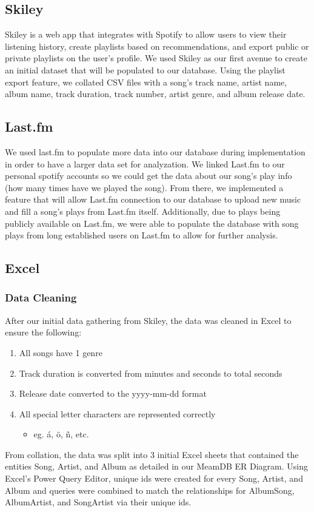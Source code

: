 \documentclass[12pt]{article}
\begin{document}
    \subsection{Skiley}
    Skiley is a web app that integrates with Spotify to allow users to view their listening history,
    create playlists based on recommendations, and export public or private playlists on the user's profile.
    We used Skiley as our first avenue to create an initial dataset that will be populated to our database.
    Using the playlist export feature, we collated CSV files with a song's track name, artist name, album name,
    track duration, track number, artist genre, and album release date.

    \subsection{Last.fm}
    We used last.fm to populate more data into our database during implementation
    in order to have a larger data set for analyzation. We linked Last.fm to our
    personal spotify accounts so we could get the data about our song's play info
    (how many times have we played the song). From there, we implemented a feature
    that will allow Last.fm connection to our database to upload new music and fill
    a song's plays from Last.fm itself. Additionally, due to plays being publicly
    available on Last.fm, we were able to populate the database with song plays from
    long established users on Last.fm to allow for further analysis.

    \subsection{Excel}
    \subsubsection{Data Cleaning}
    After our initial data gathering from Skiley, the data was cleaned in Excel to ensure
    the following:
    \begin{enumerate}
        \item All songs have 1 genre
        \item Track duration is converted from minutes and seconds to total seconds
        \item Release date converted to the yyyy-mm-dd format
        \item All special letter characters are represented correctly
            \begin{itemize}
                \item eg. \'{a}, \"{o}, \~{n}, etc.
            \end{itemize}
    \end{enumerate}
    From collation, the data was split into 3 initial Excel sheets that contained the entities Song,
    Artist, and Album as detailed in our MeamDB ER Diagram. Using Excel's Power Query Editor, unique
    ids were created for every Song, Artist, and Album and queries were combined to match the relationships
    for AlbumSong, AlbumArtist, and SongArtist via their unique ids.
\end{document}
